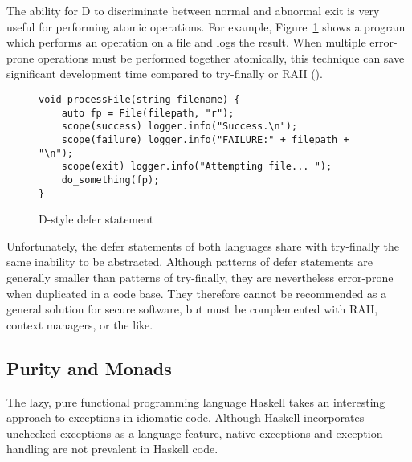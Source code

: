 \documentclass[11pt]{article}
\newcommand{\maybePage}{\null}
\begin{document}
The ability for D to discriminate between normal and abnormal exit is very useful for performing atomic operations.
For example, Figure~\ref{Dscope} shows a program which performs an operation on a file and logs the result.
When multiple error-prone operations must be performed together atomically, this technique can save significant development time compared to try-finally or RAII (\cite{DExceptionSafety}).

\begin{figure}[H]
\caption{D-style defer statement}
\label{Dscope}

\begin{verbatim}
void processFile(string filename) {
    auto fp = File(filepath, "r");
    scope(success) logger.info("Success.\n");
    scope(failure) logger.info("FAILURE:" + filepath + "\n");
    scope(exit) logger.info("Attempting file... ");
    do_something(fp);
}
\end{verbatim}

\end{figure}

Unfortunately, the defer statements of both languages share with try-finally the same inability to be abstracted.
Although patterns of defer statements are generally smaller than patterns of try-finally, they are nevertheless error-prone when duplicated in a code base.
They therefore cannot be recommended as a general solution for secure software, but must be complemented with RAII, context managers, or the like.




\maybePage
\subsection{Purity and Monads}
\label{subsec:exceptionMonads}
The lazy, pure functional programming language Haskell takes an interesting approach to exceptions in idiomatic code.
Although Haskell incorporates unchecked exceptions as a language feature, native exceptions and exception handling are not prevalent in Haskell code.
\end{document}
